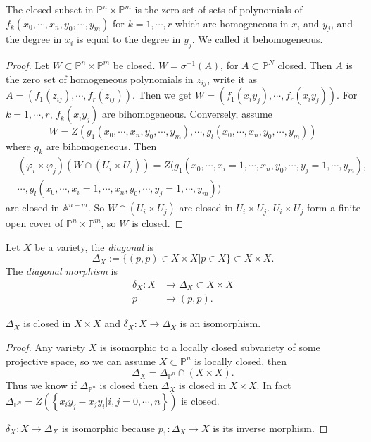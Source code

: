 \begin{lemma}
	The closed subset in $ \mathbb{P}^n\times \mathbb{P}^m $ is the zero set of sets of polynomials of $ f_k(x_0,\cdots,x_n,y_0,\cdots,y_m) $ for $ k=1,\cdots,r $ which are homogeneous in  $ x_i $ and $ y_j $, and the degree in $ x_i $ is equal to the degree in $ y_j $. We called it behomogeneous.
\end{lemma}
\begin{proof}
	Let $ W\subset \mathbb{P}^n\times \mathbb{P}^m $ be closed. $ W=\sigma^{-1}(A) $, for $ A\subset \mathbb{P}^N $ closed.
	Then $ A $ is the zero set of homogeneous polynomials in $ z_{ij} $, write it as $ A=(f_1(z_{ij}),\cdots,f_r(z_{ij})) $. Then we get $ W=(f_1(x_iy_j),\cdots,f_r(x_iy_j)) $.  For $ k=1,\cdots,r $, $ f_k(x_iy_j) $ are bihomogeneous. Conversely, assume $$ W=Z( g_1(x_0,\cdots,x_n,y_0,\cdots,y_m),  \cdots,g_l(x_0,\cdots,x_n,y_0,\cdots,y_m )) $$
	where $ g_{k} $ are bihomogeneous. Then
	$$
		\begin{array}{cc}
			{} & (\varphi_i\times\varphi_j)(W\cap (U_i\times U_j))=Z( g_1(x_0,\cdots,x_i=1,\cdots,x_n,y_0,\cdots,y_j=1,\cdots,y_m), \\
			{} & \cdots,g_l(x_0,\cdots,x_i=1,\cdots,x_n,y_0,\cdots,y_j=1,\cdots,y_m) )
		\end{array}
	$$
	are closed in $\mathbb{A}^{n+m}  $. So $ W\cap (U_i\times U_j) $ are closed in $ U_i\times U_j $. $ U_i\times U_j $ form a finite open cover of $ \mathbb{P}^n\times \mathbb{P}^m $, so $ W $ is closed.
\end{proof}
\begin{definition}
	Let $ X $ be a variety, the \textit{diagonal} is
	$$
		\Delta_X:=\{ (p,p)\in X\times X|p\in X \}\subset X\times X.
	$$
	The \textit{diagonal morphism} is
	$$\begin{array}{cc}
			\delta_X:X & \to \Delta_X\subset X\times X \\
			p          & \to (p,p).
		\end{array}$$
\end{definition}
\begin{lemma}\label{20}
	$ \Delta_X $ is closed in $ X\times X $ and $ \delta_X:X\to \Delta_X $ is an isomorphism.
\end{lemma}
\begin{proof}
	Any variety $ X $ is isomorphic to a locally closed subvariety of some projective space, so we can assume $ X\subset\mathbb{P}^n $ is locally closed, then
	$$
		\Delta_X=\Delta_{\mathbb{P}^n}\cap (X\times X).
	$$
	Thus we know if $ \Delta_{\mathbb{P}^n} $ is closed then $ \Delta_X $ is closed in $ X\times X $.
	In fact $ \Delta_{\mathbb{P}^n}=Z\left( \left\lbrace x_iy_j-x_jy_i|i,j=0,\cdots,n \right\rbrace \right) $ is closed.

	$ \delta_X:X\to \Delta_X $ is isomorphic because $ p_1:\Delta_X\to X $ is its inverse morphism.
\end{proof}
